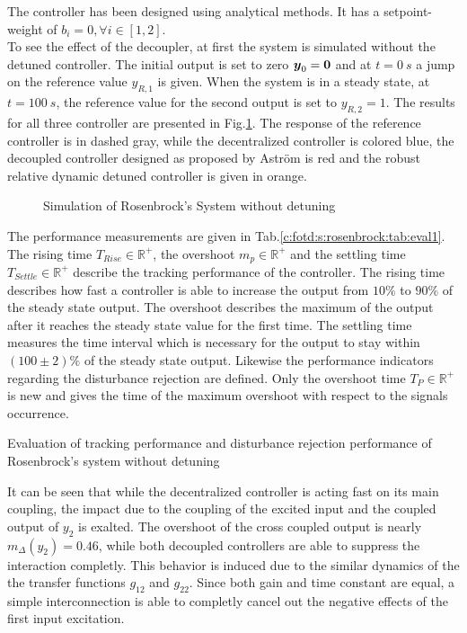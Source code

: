 The controller has been designed using analytical methods. It has a setpoint-weight of $b_i = 0, \forall i \in [1,2]$.\\

To see the effect of the decoupler, at first the system is simulated without the detuned controller.  The initial output is set to zero $\mbox{\boldmath$y$}_0 = \mbox{\boldmath$0$}$ and at $t = 0~s$ a jump on the reference value $y_{R,1}$ is given. When the system is in a steady state, at $t = 100~s$, the reference value for the second output is set to $y_{R,2} = 1$. The results for all three controller are presented in Fig.\ref{c:fotd:s:rosenbrock:f:SimNonDetuned}. The response of the reference controller is in dashed gray, while the decentralized controller is colored blue, the decoupled controller designed as proposed by Astr\"om is red and the robust relative dynamic detuned controller is given in orange.\\

\begin{figure}[H]\centering

\caption{Simulation of Rosenbrock's System without detuning}
\label{c:fotd:s:rosenbrock:f:SimNonDetuned}
\end{figure}

The performance measurements are given in Tab.\ref{c:fotd:s:rosenbrock:tab:eval1}. The rising time $T_{Rise} \in \mathbb{R}^+$, the overshoot $m_p \in \mathbb{R}^+$ and the settling time $T_{Settle} \in \mathbb{R}^+$ describe the tracking performance of the controller. The rising time describes how fast a controller is able to increase the output from $10\%$ to $90\%$ of the steady state output. The overshoot describes the maximum of the output after it reaches the steady state value for the first time. The settling time measures the time interval which is necessary for the output to stay within $\left(100 \pm 2\right)\%$ of the steady state output. Likewise the performance indicators regarding the disturbance rejection are defined. Only the overshoot time $T_P \in \mathbb{R}^+$ is new and gives the time of the maximum overshoot with respect to the signals occurrence. 

\begin{table}[H]
\centering
\caption{Evaluation of tracking performance and disturbance rejection performance of Rosenbrock's system without detuning}
\label{c:fotd:s:rosenbrock:tab:eval1}

\end{table}
It can be seen that while the decentralized controller is acting fast on its main coupling, the impact due to the coupling of the excited input and the coupled output of $y_2$ is exalted. The overshoot of the cross coupled output is nearly $m_{\Delta}(y_2) = 0.46$, while both decoupled controllers are able to suppress the interaction completly. This behavior is induced due to the similar dynamics of the the transfer functions $g_{12}$ and $g_{22}$. Since both gain and time constant are equal, a simple interconnection is able to completly cancel out the negative effects of the first input excitation.\\

